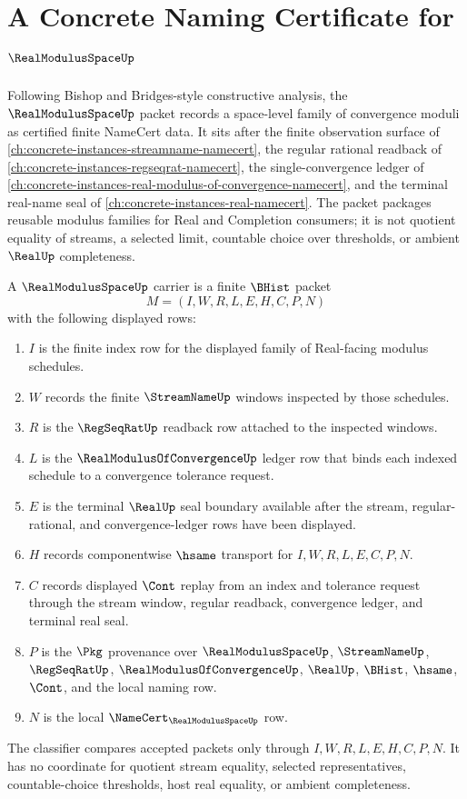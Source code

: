 \chapter{A Concrete Naming Certificate for $\RealModulusSpaceUp$}
\label{ch:concrete-instances-real-modulus-space-namecert}

Following Bishop and Bridges-style constructive analysis, the
$\RealModulusSpaceUp$ packet records a space-level family of convergence
moduli as certified finite NameCert data. It sits after the finite observation
surface of \autoref{ch:concrete-instances-streamname-namecert}, the regular
rational readback of \autoref{ch:concrete-instances-regseqrat-namecert}, the
single-convergence ledger of
\autoref{ch:concrete-instances-real-modulus-of-convergence-namecert}, and the
terminal real-name seal of \autoref{ch:concrete-instances-real-namecert}. The
packet packages reusable modulus families for Real and Completion consumers; it
is not quotient equality of streams, a selected limit, countable choice over
thresholds, or ambient $\RealUp$ completeness.

\begin{definition}
\label{def:real-modulus-space-carrier}
A $\RealModulusSpaceUp$ carrier is a finite $\BHist$ packet
$$
M=(I,W,R,L,E,H,C,P,N)
$$
with the following displayed rows:
\begin{enumerate}
\item $I$ is the finite index row for the displayed family of Real-facing
modulus schedules.
\item $W$ records the finite $\StreamNameUp$ windows inspected by those
schedules.
\item $R$ is the $\RegSeqRatUp$ readback row attached to the inspected windows.
\item $L$ is the $\RealModulusOfConvergenceUp$ ledger row that binds each
indexed schedule to a convergence tolerance request.
\item $E$ is the terminal $\RealUp$ seal boundary available after the stream,
regular-rational, and convergence-ledger rows have been displayed.
\item $H$ records componentwise $\hsame$ transport for $I,W,R,L,E,C,P,N$.
\item $C$ records displayed $\Cont$ replay from an index and tolerance request
through the stream window, regular readback, convergence ledger, and terminal
real seal.
\item $P$ is the $\Pkg$ provenance over $\RealModulusSpaceUp$,
$\StreamNameUp$, $\RegSeqRatUp$, $\RealModulusOfConvergenceUp$, $\RealUp$,
$\BHist$, $\hsame$, $\Cont$, and the local naming row.
\item $N$ is the local $\NameCert_{\RealModulusSpaceUp}$ row.
\end{enumerate}
The classifier compares accepted packets only through
$I,W,R,L,E,H,C,P,N$. It has no coordinate for quotient stream equality,
selected representatives, countable-choice thresholds, host real equality, or
ambient completeness.
\end{definition}

